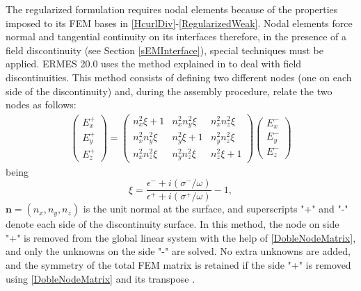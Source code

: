 The regularized formulation requires nodal elements because of the properties imposed to its FEM bases in \ref{HcurlDiv}-\ref{RegularizedWeak}. Nodal elements force normal and tangential continuity on its interfaces therefore, in the presence of a field discontinuity (see Section \ref{sEMInterface}), special techniques must be applied. ERMES 20.0 uses the method explained in \cite{DobleNodo} to deal with field discontinuities. This method consists of defining two different nodes (one on each side of the discontinuity) and, during the assembly procedure, relate the two nodes as follows:
\begin{equation}\label{DobleNodeMatrix}
	\begin{aligned}
		\left(\begin{array}{c}
			E_{x}^{+}\\
			E_{y}^{+}\\
			E_{z}^{+}
		\end{array}\right) =
		\left(\begin{array}{lll}
			n_{x}^{2}\xi+1            & n_{x}^{2}n_{y}^{2}\xi     & n_{x}^{2}n_{z}^{2}\xi  \\
			n_{x}^{2}n_{y}^{2}\xi     & n_{y}^{2}\xi+1            & n_{y}^{2}n_{z}^{2}\xi  \\
			n_{x}^{2}n_{z}^{2}\xi     & n_{y}^{2}n_{z}^{2}\xi     &
			n_{z}^{2}\xi+1
		\end{array}\right)
		\left(\begin{array}{c}
			E_{x}^{-}\\
			E_{y}^{-}\\
			E_{z}^{-}
		\end{array}\right)
	\end{aligned}
\end{equation}
being
\[
\xi = \frac{\epsilon^{-} + i\left(\sigma^{-}/\omega\right)}{\epsilon^{+} + i\left(\sigma^{+}/\omega\right)} - 1,
\]
$\mathbf{n} = (n_{x},n_{y},n_{z})$ is the unit normal at the surface, and superscripts "+" and "-" denote each side of the discontinuity surface. In this method, the node on side "+" is removed from the global linear system with the help of \eqref{DobleNodeMatrix}, and only the unknowns on the side "-" are solved. No extra unknowns are added, and the symmetry of the total FEM matrix is retained if the side "+" is removed using \eqref{DobleNodeMatrix} and its transpose \cite{PotencialNodalFormulation}.


